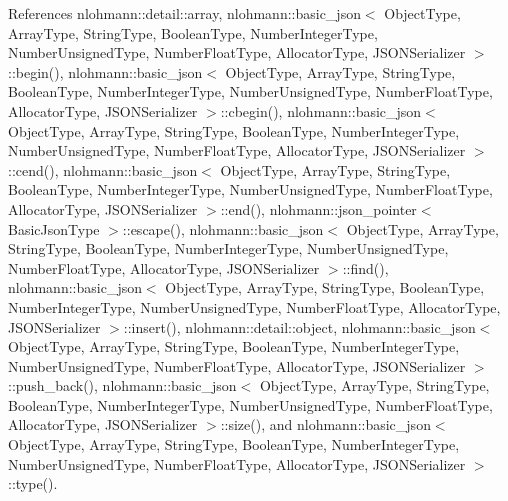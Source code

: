 References nlohmann\+::detail\+::array, nlohmann\+::basic\+\_\+json$<$ Object\+Type, Array\+Type, String\+Type, Boolean\+Type, Number\+Integer\+Type, Number\+Unsigned\+Type, Number\+Float\+Type, Allocator\+Type, J\+S\+O\+N\+Serializer $>$\+::begin(), nlohmann\+::basic\+\_\+json$<$ Object\+Type, Array\+Type, String\+Type, Boolean\+Type, Number\+Integer\+Type, Number\+Unsigned\+Type, Number\+Float\+Type, Allocator\+Type, J\+S\+O\+N\+Serializer $>$\+::cbegin(), nlohmann\+::basic\+\_\+json$<$ Object\+Type, Array\+Type, String\+Type, Boolean\+Type, Number\+Integer\+Type, Number\+Unsigned\+Type, Number\+Float\+Type, Allocator\+Type, J\+S\+O\+N\+Serializer $>$\+::cend(), nlohmann\+::basic\+\_\+json$<$ Object\+Type, Array\+Type, String\+Type, Boolean\+Type, Number\+Integer\+Type, Number\+Unsigned\+Type, Number\+Float\+Type, Allocator\+Type, J\+S\+O\+N\+Serializer $>$\+::end(), nlohmann\+::json\+\_\+pointer$<$ Basic\+Json\+Type $>$\+::escape(), nlohmann\+::basic\+\_\+json$<$ Object\+Type, Array\+Type, String\+Type, Boolean\+Type, Number\+Integer\+Type, Number\+Unsigned\+Type, Number\+Float\+Type, Allocator\+Type, J\+S\+O\+N\+Serializer $>$\+::find(), nlohmann\+::basic\+\_\+json$<$ Object\+Type, Array\+Type, String\+Type, Boolean\+Type, Number\+Integer\+Type, Number\+Unsigned\+Type, Number\+Float\+Type, Allocator\+Type, J\+S\+O\+N\+Serializer $>$\+::insert(), nlohmann\+::detail\+::object, nlohmann\+::basic\+\_\+json$<$ Object\+Type, Array\+Type, String\+Type, Boolean\+Type, Number\+Integer\+Type, Number\+Unsigned\+Type, Number\+Float\+Type, Allocator\+Type, J\+S\+O\+N\+Serializer $>$\+::push\+\_\+back(), nlohmann\+::basic\+\_\+json$<$ Object\+Type, Array\+Type, String\+Type, Boolean\+Type, Number\+Integer\+Type, Number\+Unsigned\+Type, Number\+Float\+Type, Allocator\+Type, J\+S\+O\+N\+Serializer $>$\+::size(), and nlohmann\+::basic\+\_\+json$<$ Object\+Type, Array\+Type, String\+Type, Boolean\+Type, Number\+Integer\+Type, Number\+Unsigned\+Type, Number\+Float\+Type, Allocator\+Type, J\+S\+O\+N\+Serializer $>$\+::type().


